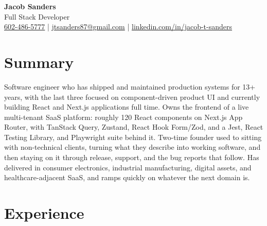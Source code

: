 \documentclass[10.5pt, letterpaper]{article}
\begin{document}
\begin{center}
  {\fontsize{28}{32}\selectfont\bfseries\color{accent} Jacob Sanders}\\[5pt]
  {\large\color{muted} Full Stack Developer}\\[8pt]
  \small
  \faPhone\enspace \href{tel:6024865777}{602-486-5777}
  \enspace\textcolor{accent}{|}\enspace
  \faEnvelope\enspace \href{mailto:jtsanders87@gmail.com}{jtsanders87@gmail.com}
  \enspace\textcolor{accent}{|}\enspace
  \faLinkedin\enspace \href{https://linkedin.com/in/jacob-t-sanders}{linkedin.com/in/jacob-t-sanders}
\end{center}

\vspace{2pt}

\section{Summary}

Software engineer who has shipped and maintained production systems for 13+
years, with the last three focused on component-driven product UI and currently
building React and Next.js applications full time. Owns the frontend of a live
multi-tenant SaaS platform: roughly 120 React components on Next.js App Router,
with TanStack Query, Zustand, React Hook Form/Zod, and a Jest, React Testing
Library, and Playwright suite behind it. Two-time founder used to sitting with
non-technical clients, turning what they describe into working software, and
then staying on it through release, support, and the bug reports that follow.
Has delivered in consumer electronics, industrial manufacturing, digital assets,
and healthcare-adjacent SaaS, and ramps quickly on whatever the next domain is.

\section{Experience}
\end{document}
